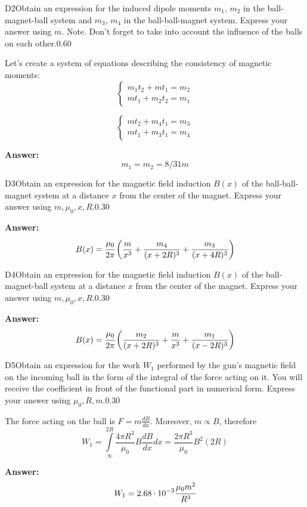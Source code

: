 \documentclass[11pt,a4paper]{article}
\begin{document}
\begin{solcard}{D2}{Obtain an expression for the induced dipole moments $m_1$, $m_2$ in the ball-magnet-ball system and $m_3$, $m_4$ in the ball-ball-magnet system. Express your answer using $m$. Note. Don't forget to take into account the influence of the balls on each other.}{0.60}

Let's create a system of equations describing the consistency of magnetic moments: \[ \begin{cases} m_1t_2 + mt_1 = m_2  \\ mt_1 + m_2 t_2  = m_1 \end{cases} \]


\[ \begin{cases} mt_2 + m_4t_1 = m_3  \\ mt_1 + m_3 t_1  = m_4 \end{cases} \]

\par\smallskip\noindent\textbf{Answer:} $$m_1 = m_2 = 8/31 m$$
\end{solcard}

\begin{solcard}{D3}{Obtain an expression for the magnetic field induction $B(x)$ of the ball-ball-magnet system at a distance $x$ from the center of the magnet. Express your answer using $m,\mu_0, x, R$.}{0.30}
\par\smallskip\noindent\textbf{Answer:} $$B(x) = \cfrac{\mu_0}{2\pi}\left( \frac{m}{x^3} + \frac{m_4}{(x+2R)^3} + \frac{m_3}{(x + 4R)^3} \right)$$
\end{solcard}

\begin{solcard}{D4}{Obtain an expression for the magnetic field induction $B(x)$ of the ball-magnet-ball system at a distance $x$ from the center of the magnet. Express your answer using $m,\mu_0, x, R$.}{0.30}
\par\smallskip\noindent\textbf{Answer:} $$B(x) = \cfrac{\mu_0}{2\pi}\left( \frac{m_2}{(x+2R)^3} + \frac{m}{x^3} + \frac{m_1}{(x - 2R)^3} \right)$$
\end{solcard}

\begin{solcard}{D5}{Obtain an expression for the work $W_1$ performed by the gun's magnetic field on the incoming ball in the form of the integral of the force acting on it. You will receive the coefficient in front of the functional part in numerical form. Express your answer using $\mu_0, R, m$.}{0.30}

The force acting on the ball is $F=m \frac{dB}{dx}$. Moreover, $m \propto B$, therefore \[ W_1 = \int\limits_\infty^{2R} \frac{4\pi R^3}{\mu_0 } B \frac{dB}{dx} dx = \frac{2\pi R^3}{\mu_0} B^2(2R) \]

\par\smallskip\noindent\textbf{Answer:} \[ W_1 = 2.68 \cdot 10^{-3} \cfrac{\mu_0 m^2}{R^3}\]
\end{solcard}
\end{document}
